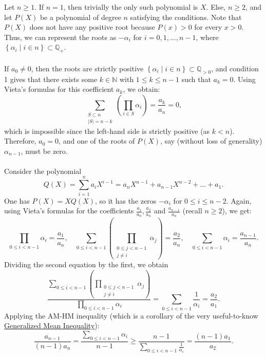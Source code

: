 \begin{solution}
    Let \( n\geq 1 \). If \( n=1 \), then trivially the only such polynomial is \( X \). Else, \( n\geq 2 \), and let \( P\left(X\right) \) be a polynomial of degree \( n \) satisfying the conditions. Note that \( P\left(X\right) \) does not have any positive root because \( P\left(x\right) > 0 \) for every \( x > 0 \). Thus, we can represent the roots as \( -\alpha_i \) for \( i = 0,1, \dots, n-1 \), where \( \left\{\alpha_i\mid i\in n\right\}\subset\mathbb{Q}_{+} \).
    \\\\
    If \( a_0 \neq 0 \), then the roots are strictly positive \( \left\{\alpha_i\mid i\in n\right\}\subset\mathbb{Q}_{>0} \), and condition 1 gives that there exists some \( k \in \mathbb{N} \) with \( 1 \leq k \leq n-1 \) such that \( a_k = 0 \). Using Vieta's formulas for this coefficient \( a_k \), we obtain:
    \[
        \sum_{\substack{S\subset n\\|S|=n-k}}\left(\prod_{i\in S}\alpha_i\right)= \frac{a_k}{a_n}=0,
    \]
    which is impossible since the left-hand side is strictly positive (as \( k<n \)). Therefore, \( a_0 = 0 \), and one of the roots of \( P\left(X\right) \), say (without loss of generality) \( \alpha_{n-1} \), must be zero.
    \\\\
    Consider the polynomial \[
        Q\left(X\right) = \sum_{i=1}^{n}a_iX^{i-1}=a_n X^{n-1} + a_{n-1} X^{n-2} + \dots + a_1.
    \]
    One has \( P\left(X\right)=XQ\left(X\right) \), so it has the zeros \( -\alpha_i \) for \( 0\leq i\leq n-2 \). Again, using Vieta's formulas for the coefficients \( \frac{a_1}{a_n},\frac{a_{2}}{a_n} \) and \( \frac{a_{n-1}}{a_n} \) (recall \( n\geq 2 \)), we get:
    \[
        \prod_{0\leq i<n-1}\alpha_i = \frac{a_1}{a_n},\quad \sum_{0\leq i<n-1}\left(\prod_{\substack{0\leq j<n-1\\j\neq i}}\alpha_j\right)= \frac{a_2}{a_n}, \quad \sum_{0\leq i<n-1}\alpha_i= \frac{a_{n-1}}{a_n}.
    \]
    Dividing the second equation by the first, we obtain
    \[
        \frac{\sum_{0\leq i<n-1}\left(\prod_{\substack{0\leq j<n-1\\j\neq i}}\alpha_j\right)}{\prod_{0\leq i<n-1}\alpha_i}=\sum_{0\leq i<n-1}\frac{1}{\alpha_i} = \frac{a_{2}}{a_1}.
    \]
    Applying the AM-HM inequality (which is a corollary of the very useful-to-know \href{https://en.wikipedia.org/wiki/Generalized_mean#Generalized_mean_inequality}{Generalized Mean Inequality}):
    \[
        \frac{a_{n-1}}{\left(n-1\right)a_n} = \frac{\sum_{0\leq i<n-1}\alpha_i}{n-1} \geq \frac{n-1}{\sum_{0\leq i<n-1}\frac{1}{\alpha_i}} = \frac{\left(n-1\right)a_1}{a_{2}}.
\]
\end{solution}
